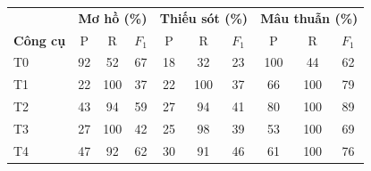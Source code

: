 \begin{tabular}{lccccccccc}
\toprule
& \multicolumn{3}{c}{\textbf{Mơ hồ (\%)}} & \multicolumn{3}{c}{\textbf{Thiếu sót (\%)}} & \multicolumn{3}{c}{\textbf{Mâu thuẫn (\%)}} \\
\textbf{Công cụ} & P & R & $F_1$ & P & R & $F_1$ & P & R & $F_1$ \\
\midrule
T0 & 92 & 52 & 67 & 18 & 32 & 23 & 100 & 44 & 62 \\
T1 & 22 & 100 & 37 & 22 & 100 & 37 & 66 & 100 & 79 \\
T2 & 43 & 94 & 59 & 27 & 94 & 41 & 80 & 100 & 89 \\
T3 & 27 & 100 & 42 & 25 & 98 & 39 & 53 & 100 & 69 \\
T4 & 47 & 92 & 62 & 30 & 91 & 46 & 61 & 100 & 76 \\
\bottomrule
\end{tabular}
